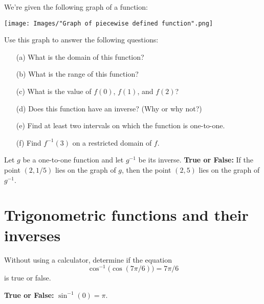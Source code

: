 \documentclass[handout]{ximera}
\begin{document}
\begin{problem}
  \label{problem:properties-of-fuction-from-graph}
  We're given the following graph of a function:
  \begin{image}
    \texttt{[image: Images/"Graph of piecewise defined function".png]}
  \end{image}
  Use this graph to answer the following questions:
  \begin{itemize}
    \item[(a)]
      What is the domain of this function?

    \item[(b)]
      What is the range of this function?

    \item[(c)]
      What is the value of $f(0)$, $f(1)$, and $f(2)$?

    \item[(d)]
      Does this function have an inverse?
      (Why or why not?)

    \item[(e)]
      Find at least two intervals on which the function is one-to-one.

    \item[(f)]
      Find $f^{-1}(3)$ on a restricted domain of $f$.
  \end{itemize}
\end{problem}

\begin{problem}
  \label{problem:applying-definition-of-inverse-function}
  Let $g$ be a one-to-one function and let $g^{-1}$ be its inverse.
  \textbf{True or False:}
  If the point $(2, 1/5)$ lies on the graph of $g$, then the point $(2, 5)$ lies on the graph of $g^{-1}$.
\end{problem}

\section{Trigonometric functions and their inverses}
\label{section:trigonometric-functions-and-their-inverses}

\begin{problem}
  \label{problem:applying-domain-of-arccos}
  Without using a calculator, determine if the equation
  \[
    \cos^{-1}\bigl(\cos(7\pi/6)\bigr) = 7\pi/6
  \]
  is true or false.
\end{problem}

\begin{problem}
  \label{problem:applying-domain-of-arcsin}
  \textbf{True or False:}
  $\sin^{-1}(0) = \pi$.
\end{problem}
\end{document}
